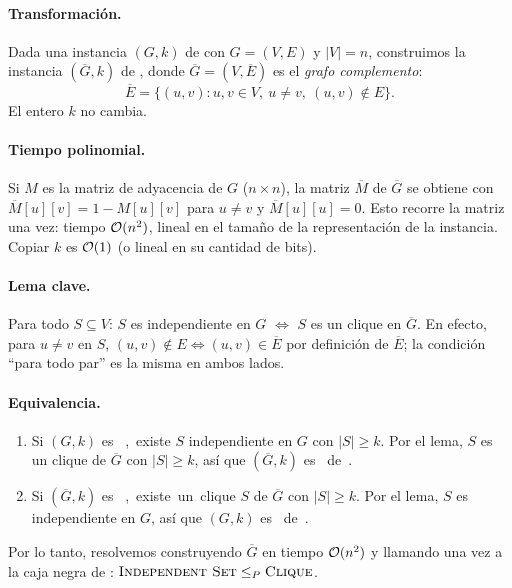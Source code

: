 \paragraph{Transformación.} Dada una instancia $(G,k)$ de \IS{} con $G=(V,E)$ y $|V|=n$, construimos la
instancia $(\overline G, k)$ de \Cl, donde $\overline G = (V,\overline E)$ es el \emph{grafo complemento}:
\[
  \overline E = \{(u,v) : u,v\in V,\ u\neq v,\ (u,v)\notin E\}.
\]
El entero $k$ no cambia.

\paragraph{Tiempo polinomial.} Si $M$ es la matriz de adyacencia de $G$ ($n\times n$), la matriz
$\overline M$ de $\overline G$ se obtiene con $\overline M[u][v] = 1 - M[u][v]$ para $u\neq v$ y
$\overline M[u][u]=0$. Esto recorre la matriz una vez: tiempo $\mathcal{O}(n^2)$, lineal en el tamaño de la
representación de la instancia. Copiar $k$ es $\mathcal{O}(1)$ (o lineal en su cantidad de bits).

\paragraph{Lema clave.} Para todo $S\subseteq V$: $S$ es independiente en $G$ $\iff$ $S$ es un clique en
$\overline G$. En efecto, para $u\ne v$ en $S$, $(u,v)\notin E \iff (u,v)\in\overline E$ por definición de
$\overline E$; la condición ``para todo par'' es la misma en ambos lados.

\paragraph{Equivalencia.}
\begin{enumerate}[label=(\roman*)]
  \item Si $(G,k)$ es \SI{}, existe $S$ independiente en $G$ con $|S|\ge k$. Por el lema, $S$ es un clique
  de $\overline G$ con $|S|\ge k$, así que $(\overline G,k)$ es \SI{} de \Cl.
  \item Si $(\overline G,k)$ es \SI{}, existe un clique $S$ de $\overline G$ con $|S|\ge k$. Por el lema, $S$
  es independiente en $G$, así que $(G,k)$ es \SI{} de \IS.
\end{enumerate}

Por lo tanto, resolvemos \IS{} construyendo $\overline G$ en tiempo $\mathcal{O}(n^2)$ y llamando una vez a la caja
negra de \Cl: $\textsc{Independent Set}\le_P\textsc{Clique}$.

